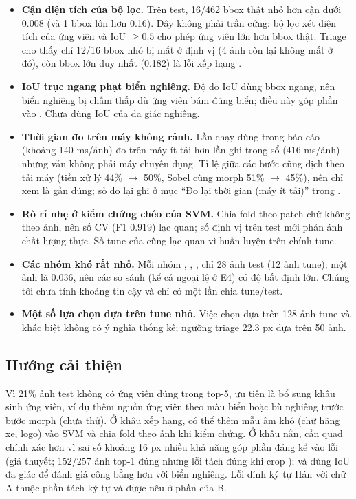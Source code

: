\begin{itemize}
  \item \textbf{Cận diện tích của bộ lọc.} Trên test, 16/462 bbox thật nhỏ hơn cận dưới  0.008 (và 1 bbox lớn hơn 0.16). Đây không phải trần cứng: bộ lọc xét diện tích  của ứng viên và IoU $\ge 0.5$ cho phép ứng viên lớn hơn bbox thật. Triage cho thấy chỉ 12/16 bbox nhỏ bị mất ở định vị (4 ảnh còn lại không mất ở đó), còn bbox lớn duy nhất (0.182) là lỗi xếp hạng .
  \item \textbf{IoU trục ngang phạt biển nghiêng.} Độ đo IoU dùng bbox ngang, nên biển nghiêng bị chấm thấp dù ứng viên bám đúng biển; điều này góp phần vào . Chưa dùng IoU của đa giác nghiêng.
  \item \textbf{Thời gian đo trên máy không rảnh.} Lần chạy dùng trong báo cáo (khoảng 140 ms/ảnh) đo trên máy ít tải hơn lần ghi trong sổ (416 ms/ảnh) nhưng vẫn không phải máy chuyên dụng. Tỉ lệ giữa các bước cũng dịch theo tải máy (tiền xử lý 44\% $\to$ 50\%, Sobel cùng morph 51\% $\to$ 45\%), nên chỉ xem là gần đúng; số đo lại ghi ở mục ``Đo lại thời gian (máy ít tải)'' trong .
  \item \textbf{Rò rỉ nhẹ ở kiểm chứng chéo của SVM.} Chia fold theo patch chứ không theo ảnh, nên số CV (F1 0.919) lạc quan; số định vị trên test mới phản ánh chất lượng thực. Số tune của  cũng lạc quan vì huấn luyện trên chính tune.
  \item \textbf{Các nhóm khó rất nhỏ.} Mỗi nhóm , , ,  chỉ 28 ảnh test (12 ảnh tune); một ảnh là 0.036, nên các so sánh (kể cả ngoại lệ  ở E4) có độ bất định lớn. Chúng tôi chưa tính khoảng tin cậy và chỉ có một lần chia tune/test.
  \item \textbf{Một số lựa chọn dựa trên tune nhỏ.} Việc chọn  dựa trên 128 ảnh tune và khác biệt không có ý nghĩa thống kê; ngưỡng triage 22.3 px dựa trên 50 ảnh.
\end{itemize}

\subsection{Hướng cải thiện}

Vì 21\% ảnh test không có ứng viên đúng trong top-5, ưu tiên là bổ sung khâu sinh ứng viên, ví dụ thêm nguồn ứng viên theo màu biển hoặc bù nghiêng trước bước morph (chưa thử). Ở khâu xếp hạng, có thể thêm mẫu âm khó (chữ hãng xe, logo) vào SVM và chia fold theo ảnh khi kiểm chứng. Ở khâu nắn, cần quad chính xác hơn vì sai số khoảng 16 px nhiều khả năng góp phần đáng kể vào lỗi (giả thuyết; 152/257 ảnh top-1 đúng nhưng lỗi tách đúng khi crop ); và dùng IoU đa giác để đánh giá công bằng hơn với biển nghiêng. Lỗi dính ký tự Hán với chữ A thuộc phần tách ký tự và được nêu ở phần của B.

